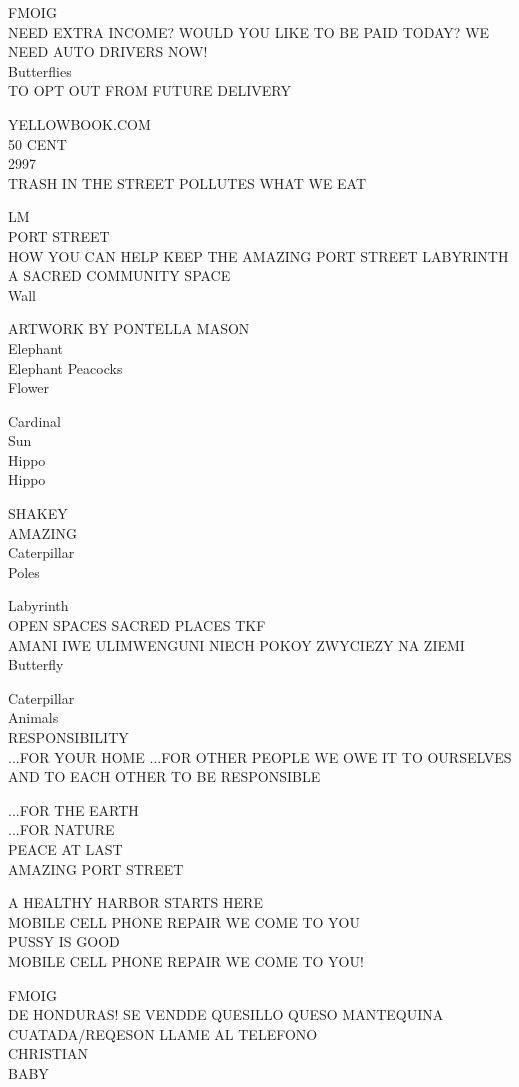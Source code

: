 \documentclass[10pt,letterpaper]{article}
\begin{document}
FMOIG\\
NEED EXTRA INCOME?  WOULD YOU LIKE TO BE PAID TODAY?  WE NEED AUTO DRIVERS NOW!\\
Butterflies\\
TO OPT OUT FROM FUTURE DELIVERY

YELLOWBOOK.COM\\
50 CENT\\
2997\\
TRASH IN THE STREET POLLUTES WHAT WE EAT

LM\\
PORT STREET\\
HOW YOU CAN HELP KEEP THE AMAZING PORT STREET LABYRINTH A SACRED COMMUNITY SPACE\\
Wall

ARTWORK BY PONTELLA MASON\\
Elephant\\
Elephant Peacocks\\
Flower

Cardinal\\
Sun\\
Hippo\\
Hippo

SHAKEY\\
AMAZING\\
Caterpillar\\
Poles

Labyrinth\\
OPEN SPACES SACRED PLACES TKF\\
AMANI IWE ULIMWENGUNI NIECH POKOY ZWYCIEZY NA ZIEMI\\
Butterfly

Caterpillar\\
Animals\\
RESPONSIBILITY\\
...FOR YOUR HOME ...FOR OTHER PEOPLE WE OWE IT TO OURSELVES AND TO EACH OTHER TO BE RESPONSIBLE

...FOR THE EARTH\\
...FOR NATURE\\
PEACE AT LAST\\
AMAZING PORT STREET

A HEALTHY HARBOR STARTS HERE\\
MOBILE CELL PHONE REPAIR WE COME TO YOU\\
PUSSY IS GOOD\\
MOBILE CELL PHONE REPAIR WE COME TO YOU!

FMOIG\\
DE HONDURAS!  SE VENDDE QUESILLO QUESO MANTEQUINA CUATADA/REQESON LLAME AL TELEFONO\\
CHRISTIAN\\
BABY
\end{document}
